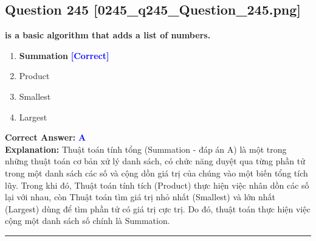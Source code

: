 \documentclass[11pt,a4paper]{article}
\begin{document}
\begin{minipage}{\textwidth}
\subsection*{Question 245 \quad \footnotesize{[0245\_q245\_Question\_245.png]}}
\noindent \textbf{is a basic algorithm that adds a list of numbers.}

\begin{enumerate}[label=\Alph*.]
    \item \textbf{Summation} \hfill \textcolor{blue}{\textbf{[Correct]}}
    \item Product
    \item Smallest
    \item Largest
\end{enumerate}

\noindent \textbf{Correct Answer:} \textcolor{blue}{\textbf{A}} \\[2pt]
\noindent \textbf{Explanation:} Thuật toán tính tổng (Summation - đáp án A) là một trong những thuật toán cơ bản xử lý danh sách, có chức năng duyệt qua từng phần tử trong một danh sách các số và cộng dồn giá trị của chúng vào một biến tổng tích lũy. Trong khi đó, Thuật toán tính tích (Product) thực hiện việc nhân dồn các số lại với nhau, còn Thuật toán tìm giá trị nhỏ nhất (Smallest) và lớn nhất (Largest) dùng để tìm phần tử có giá trị cực trị. Do đó, thuật toán thực hiện việc cộng một danh sách số chính là Summation.

\par\vspace{0.3cm}
\hrule
\vspace{0.3cm}
\end{minipage}
\end{document}
